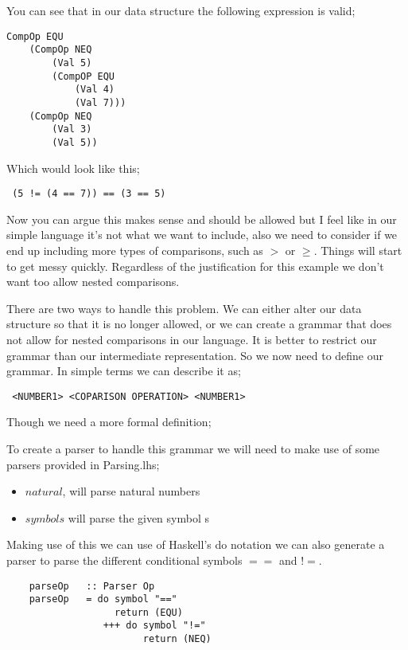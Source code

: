 \newpage

You can see that in our data structure the following expression is valid;

\begin{lstlisting}
CompOp EQU 
	(CompOp NEQ 
		(Val 5) 
		(CompOP EQU 
			(Val 4)
			(Val 7))) 
	(CompOp NEQ 
		(Val 3) 
		(Val 5))
\end{lstlisting}

Which would look like this;

\begin{lstlisting}
 (5 != (4 == 7)) == (3 == 5)
\end{lstlisting}

Now you can argue this makes sense and should be allowed but I feel like in our simple language it's not what we want to include, also we need to consider if we end up including more types of comparisons, such as $>$ or $\geq$. Things will start to get messy quickly. Regardless of the justification for this example we don't want too allow nested comparisons. 

There are two ways to handle this problem. We can either alter our data structure so that it is no longer allowed, or we can create a grammar that does not allow for nested comparisons in our language. It is better to restrict our grammar than our intermediate representation. So we now need to define our grammar. In simple terms we can describe it as;

\begin{lstlisting}
 <NUMBER1> <COPARISON OPERATION> <NUMBER1>
\end{lstlisting}   	

Though we need a more formal definition;



To create a parser to handle this grammar we will need to make use of some parsers provided in Parsing.lhs;

\begin{itemize}
\item $natural$, will parse natural numbers
\item $symbol s$ will parse the given symbol s 
\end{itemize}

Making use of this we can use of Haskell's do notation we can also generate a parser to parse the different conditional symbols $==$ and $!=$. 

\begin{lstlisting}
	parseOp   :: Parser Op
	parseOp   = do symbol "=="
	               return (EQU)
        	     +++ do symbol "!="
	                    return (NEQ) 
\end{lstlisting} 

